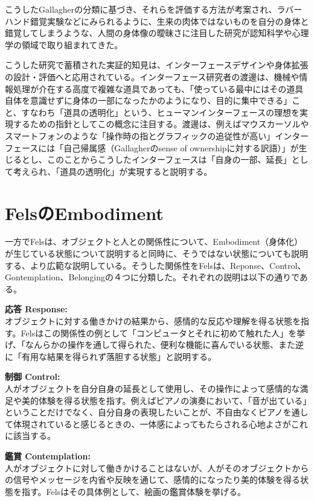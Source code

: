 こうしたGallagherの分類に基づき、それらを評価する方法が考案され、ラバーハンド錯覚実験などにみられるように、生来の肉体ではないものを自分の身体と錯覚してしまうような、人間の身体像の曖昧さに注目した研究が認知科学や心理学の領域で取り組まれてきた。

こうした研究で蓄積された実証的知見は、インターフェースデザインや身体拡張の設計・評価へと応用されている。インターフェース研究者の渡邊は、機械や情報処理が介在する高度で複雑な道具であっても、「使っている最中にはその道具自体を意識せずに身体の一部になったかのようになり、目的に集中できる」こと、すなわち「道具の透明化」という、ヒューマンインターフェースの理想を実現するための指針としてこの概念に注目する。渡邊は、例えばマウスカーソルやスマートフォンのような「操作時の指とグラフィックの追従性が高い」インターフェースには「自己帰属感（Gallagherのsense of ownershipに対する訳語）」が生じるとし、このことからこうしたインターフェースは「自身の一部、延長」として考えられ、「道具の透明化」が実現すると説明する\cite{Watanabe2013}\cite{Watanabe2017}。

\section{FelsのEmbodiment}
一方でFelsは、オブジェクトと人との関係性について、Embodiment（身体化）が生じている状態について説明すると同時に、そうではない状態についても説明する、より広範な説明している。そうした関係性をFelsは、Reponse、Control、Gontemplation、Belongingの４つに分類した。それぞれの説明は以下の通りである。

\textbf{応答 Response:}\\
オブジェクトに対する働きかけの結果から、感情的な反応や理解を得る状態を指す。Felsはこの関係性の例として「コンピュータとそれに初めて触れた人」を挙げ、「なんらかの操作を通して得られた、便利な機能に喜んでいる状態、また逆に「有用な結果を得られず落胆する状態」と説明する。

\textbf{制御 Control:}\\
人がオブジェクトを自分自身の延長として使用し、その操作によって感情的な満足や美的体験を得る状態を指す。例えばピアノの演奏において、「音が出ている」ということだけでなく、自分自身の表現したいことが、不自由なくピアノを通して体現されていると感じるときの、一体感によってもたらされる心地よさがこれに該当する。

\textbf{鑑賞 Contemplation:}\\
人がオブジェクトに対して働きかけることはないが、人がそのオブジェクトからの信号やメッセージを内省や反映を通じて、感情的になったり美的体験を得る状態を指す。Felsはその具体例として、絵画の鑑賞体験を挙げる。

